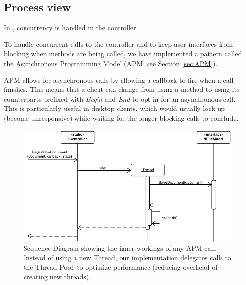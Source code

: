 \subsection{Process view}

In \SOP{}, concurrency is handled in the controller.

To handle concurrent calls to the controller and to keep user interfaces from blocking when methods
are being called, we have implemented a pattern called the Asynchronous Programming Model (APM; see
Section \ref{sec:APM}).

APM allows for asynchronous calls by allowing a callback to fire when a call finishes. This means that
a client can change from using a method to using its counterparts prefixed with \emph{Begin} and
\emph{End} to opt in for an asynchronous call. This is particularly useful in desktop clients, which
would usually lock up (become unresponsive) while waiting for the longer blocking calls to conclude.

\begin{figure}[htb]
	\centering
	\includegraphics[width=1\textwidth]{Software_architecture/graphics/apm-sequence.png}
	\caption{Sequence Diagram showing the inner workings of any APM call. Instead of using a new Thread, our implementation
        delegates calls to the Thread Pool, to optimize performance (reducing overhead of creating new threads).}
	\label{fig:apm-sequence}
\end{figure}
